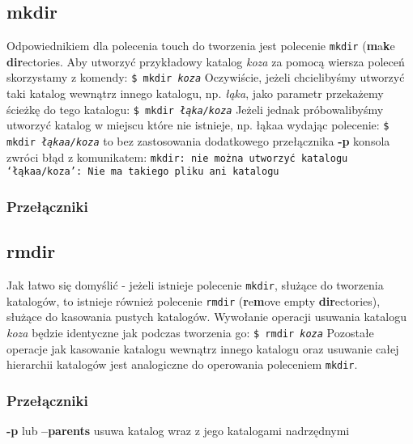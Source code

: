 \documentclass[10 pt, a4paper, draft]{article}
\begin{document}
\subsection{mkdir}
Odpowiednikiem dla polecenia touch do tworzenia jest polecenie \texttt{mkdir} (\textbf{m}a\textbf{k}e \textbf{dir}ectories. Aby utworzyć przykładowy katalog \textit{koza} za pomocą wiersza poleceń skorzystamy z komendy:
\newline
\texttt{\$ mkdir \textit{koza}}
\newline 
Oczywiście, jeżeli chcielibyśmy utworzyć taki katalog wewnątrz innego katalogu, np. \textit{łąka}, jako parametr przekażemy ścieżkę do tego katalogu:
\newline
\texttt{\$ mkdir \textit{łąka/koza}}
\newline 
Jeżeli jednak próbowalibyśmy utworzyć katalog w miejscu które nie istnieje, np. łąkaa wydając polecenie:
\newline
\texttt{\$ mkdir \textit{łąkaa/koza}}
\newline
to bez zastosowania dodatkowego przełącznika \textbf{-p} konsola zwróci błąd z komunikatem:
\newline
\texttt{mkdir: nie można utworzyć katalogu `łąkaa/koza': Nie ma takiego pliku ani katalogu}
\subsubsection*{Przełączniki}

\subsection{rmdir}
Jak łatwo się domyślić - jeżeli istnieje polecenie \texttt{mkdir}, służące do tworzenia katalogów, to istnieje również polecenie \texttt{rmdir} (\textbf{r}e\textbf{m}ove empty \textbf{dir}ectories), służące do kasowania pustych katalogów. Wywołanie operacji usuwania katalogu \textit{koza} będzie identyczne jak podczas tworzenia go:
\newline
\texttt{\$ rmdir \textit{koza}}
\newline
Pozostałe operacje jak kasowanie katalogu wewnątrz innego katalogu oraz usuwanie całej hierarchii katalogów jest analogiczne do operowania poleceniem \texttt{mkdir}.
\newline
\subsubsection*{Przełączniki}
\begin{description}
\item \textbf{-p} lub \textbf{--parents} usuwa katalog wraz z jego katalogami nadrzędnymi
\end{description}
\end{document}
